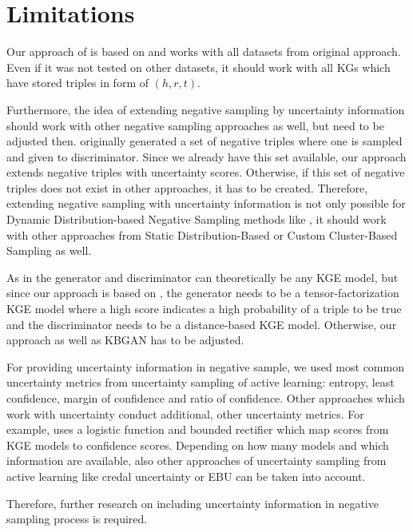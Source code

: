 \section{Limitations}  
\label{sec:limitations}

Our approach of \usgan is based on \kbgan and works with all datasets from original approach.
Even if it was not tested on other datasets, it should work with all \acp{KG} which have stored triples in form of $(h,r,t)$.

Furthermore, the idea of extending negative sampling by uncertainty information should work with other negative sampling approaches as well, but need to be adjusted then.
\kbgan originally generated a set of negative triples where one is sampled and given to discriminator.
Since we already have this set available, our approach extends negative triples with uncertainty scores.
Otherwise, if this set of negative triples does not exist in other approaches, it has to be created.
Therefore, extending negative sampling with uncertainty information is not only possible for Dynamic Distribution-based Negative Sampling methods like \kbgan, it should work with other approaches from Static Distribution-Based or Custom Cluster-Based Sampling as well.

As in \kbgan the generator and discriminator can theoretically be any \ac{KGE} model, but since our approach is based on \kbgan, the generator needs to be a tensor-factorization \ac{KGE} model where a high score indicates a high probability of a triple to be true and the discriminator needs to be a distance-based \ac{KGE} model.
Otherwise, our approach as well as \textsc{KBGAN} has to be adjusted.

For providing uncertainty information in negative sample, we used most common uncertainty metrics from uncertainty sampling of active learning:
entropy, least confidence, margin of confidence and ratio of confidence.
Other approaches which work with uncertainty conduct additional, other uncertainty metrics.
For example, \cite{UKGE} uses a logistic function and bounded rectifier which map scores from \ac{KGE} models to confidence scores.
Depending on how many models and which information are available, also other approaches of uncertainty sampling from active learning like credal uncertainty or \ac{EBU} can be taken into account.

Therefore, further research on including uncertainty information in negative sampling process is required.






